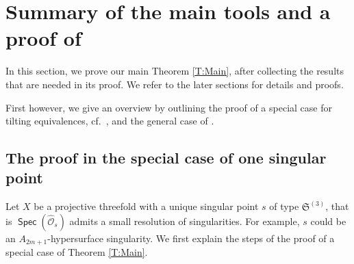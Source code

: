 \documentclass[reqno, 12pt, a4paper, twosided, english]{amsart}
\theoremstyle{plain}
\theoremstyle{definition}
\theoremstyle{remark}
\newtheorem*{Key Statement}{Key Statement}
\newcommand{\SMAL}{\mathfrak{S}}
\DeclareMathOperator{\Spec}{\mathsf{Spec}}
\begin{document}
\section{Summary of the main tools and a proof of }\label{sec:main}
In this section, we prove our main Theorem \ref{T:Main}, after collecting the results that are needed in its proof. We refer to the later sections for details and proofs. 

First however, we give an overview by outlining the proof of a special case for tilting equivalences, cf.\ , and the general case of .

\subsection*{The proof in the special case of one singular point}
Let $X$ be a projective threefold with a unique singular point $s $ of type $ \SMAL^{(3)}$, that is $\Spec(\widehat{\mathcal{O}}_s)$ admits a small resolution of singularities. For example, $s$ could be an $A_{2m+1}$-hypersurface singularity. We first explain the steps of the proof of a special case of Theorem \ref{T:Main}.
\end{document}

